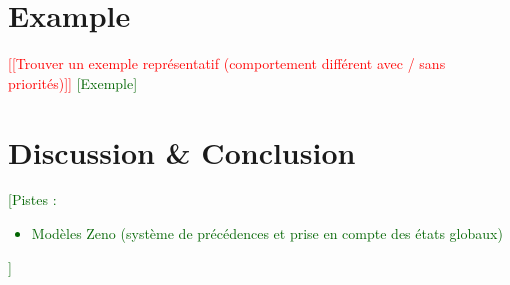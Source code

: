 \documentclass{entcs}
\newcommand{\towrite}[1]{\textcolor{darkgreen}{[#1]}}
\newcommand{\todo}[1]{\textcolor{red}{[[#1]]}}
\begin{document}






\section{Example}\label{sec:example}
\todo{Trouver un exemple représentatif (comportement différent avec / sans priorités)}
\towrite{Exemple}

\section{Discussion \& Conclusion}\label{sec:ccl}
\towrite{Pistes :
\begin{itemize}
  \item Modèles Zeno (système de précédences et prise en compte des états globaux)
\end{itemize}
}





%
\end{document}
